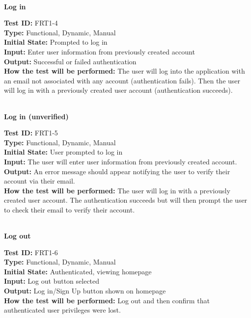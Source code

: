 \documentclass[12pt,fleqn]{article}
\begin{document}
\newpage



\textbf{\\Log in}
\begin{tcolorbox}
\textbf{Test ID:} FRT1-4\\
\textbf{Type:} Functional, Dynamic, Manual\\
\textbf{Initial State:} Prompted to log in\\
\textbf{Input:} Enter user information from previously created account\\
\textbf{Output:} Successful or failed authentication\\
\textbf{How the test will be performed:} The user will log into the application with an email not associated with any account (authentication fails). Then the user will log in with a previously created user account (authentication succeeds).
\end{tcolorbox}

\textbf{\\Log in (unverified)}
\begin{tcolorbox}
\textbf{Test ID:} FRT1-5\\
\textbf{Type:} Functional, Dynamic, Manual\\
\textbf{Initial State:} User prompted to log in\\
\textbf{Input:} The user will enter user information from previously created account.\\
\textbf{Output:} An error message should appear notifying the user to verify their account via their email.\\
\textbf{How the test will be performed:} The user will log in with a previously created user account. The authentication succeeds but will then prompt the user to check their email to verify their account. 
\end{tcolorbox}

\textbf{\\Log out}
\begin{tcolorbox}
\textbf{Test ID:} FRT1-6\\
\textbf{Type:} Functional, Dynamic, Manual\\
\textbf{Initial State:} Authenticated, viewing homepage\\
\textbf{Input:} Log out button selected\\
\textbf{Output:} Log in/Sign Up button shown on homepage\\
\textbf{How the test will be performed:} Log out and then confirm that authenticated user privileges were lost.
\end{tcolorbox}
\end{document}
